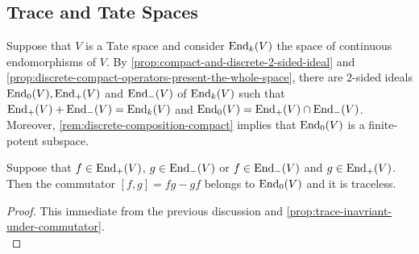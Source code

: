 \subsection{Trace and Tate Spaces}\label{Tate-and-trace}
Suppose that $V$ is a Tate space and consider $\operatorname{End}_{k}(V)$ the space of continuous endomorphisms of $V$. By \cref{prop:compact-and-discrete-2-sided-ideal} and \cref{prop:discrete-compact-operators-present-the-whole-space}, there are 2-sided ideals $\operatorname{End}_{0}(V), \operatorname{End}_{+}(V)$ and $\operatorname{End}_{-}(V)$ of $\operatorname{End}_{k}(V)$ such that $\operatorname{End}_{+}(V) + \operatorname{End}_{-}(V) = \operatorname{End}_{k}(V)$ and $\operatorname{End}_{0}(V) = \operatorname{End}_{+}(V) \cap \operatorname{End}_{-}(V)$. Moreover, \cref{rem:discrete-composition-compact} implies that $\operatorname{End}_{0}(V)$ is a finite-potent subspace.
\begin{lemma}\label{lemm:traceless-commutator}
	Suppose that $f \in \operatorname{End}_{+}(V)$, $g \in \operatorname{End}_{-}(V)$ or $f \in \operatorname{End}_{-}(V)$ and $g\in \operatorname{End}_{+}(V)$. Then the commutator $[f,g] = fg - gf$ belongs to $\operatorname{End}_{0}(V)$ and it is traceless.
\end{lemma}
\begin{proof}
	This immediate from the previous discussion and \cref{prop:trace-inavriant-under-commutator}. \\
\end{proof}


